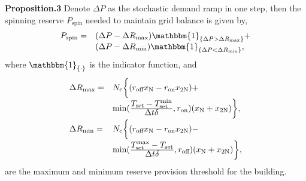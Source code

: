 \documentclass[journal]{IEEEtran}
\begin{document}
\textbf{Proposition.3} Denote $\Delta P$ as the stochastic demand ramp in one step, then the spinning reserve $P_{\textrm{spin}}$ needed to maintain grid balance is given by,
\begin{equation}
\label{spinning}
\begin{array}{ll}
P_{\textrm{spin}}=&(\Delta P-\Delta R_{\textrm{max}})\mathbbm{1}_{\{\Delta P>\Delta R_{\textrm{max}}\}}+\\
&(\Delta P-\Delta R_{\textrm{min}})\mathbbm{1}_{\{\Delta P < \Delta R_{\textrm{min}}\}},
\end{array}
\end{equation}
where $\mathbbm{1}_{\{\cdot\}}$ is the indicator function, and
\begin{equation}
\label{Rvalues}
\setlength{\extrarowheight}{7pt}
\begin{array}{ll}
\Delta R_{\textrm{max}}=&N_{\textrm{c}}\biggl\{ (r_{\textrm{off}}x_{\textrm{N}}-r_{\textrm{on}}x_{\textrm{2N}})+\\
&\min(\frac{\displaystyle
T_{\textrm{set}}-T^{\textrm{min}}_{\textrm{set}}}{\displaystyle
\Delta t \delta},r_{\textrm{on}}) (x_{\textrm{N}}+x_{\textrm{2N}})\biggr\},\\
\Delta R_{\textrm{min}}=&N_{\textrm{c}}\biggl\{ (r_{\textrm{off}}x_{\textrm{N}}-r_{\textrm{on}}x_{\textrm{2N}})-\\
&\min(\frac{\displaystyle
T^{\textrm{max}}_{\textrm{set}}-T_{\textrm{set}}}{\displaystyle
\Delta t \delta},r_{\textrm{off}}) (x_{\textrm{N}}+x_{\textrm{2N}})\biggr\},
\end{array}
\end{equation}
are the maximum and minimum reserve provision threshold for the building.
\end{document}
